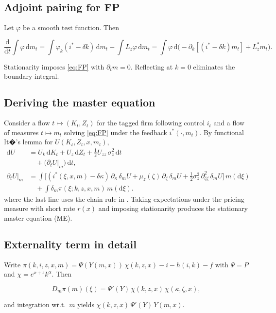 ﻿\documentclass[11pt,letterpaper,oneside]{article}
\numberwithin{equation}{section}
\newcommand{\1}{\mathbf{1}}
\newcommand{\diff}{\mathrm{d}}
\newcommand{\Lz}{L_z}
\newcommand{\Lzadj}{L_z^{\!*}}
\newcommand{\dmU}{\delta_m U}
\newcommand{\Dm}{D_m}
\begin{document}
\subsection{Adjoint pairing for FP}
Let $\varphi$ be a smooth test function. Then

$$
\frac{\diff}{\diff t}\int \varphi\,\diff m_t
= \int \varphi_k (i^*-\delta k)\,\diff m_t + \int \Lz \varphi\,\diff m_t
= \int \varphi\,\diff\Big(-\partial_k[(i^*-\delta k)m_t]+\Lzadj m_t\Big).
$$

Stationarity imposes \eqref{eq:FP} with $\partial_t m=0$. Reflecting at $k=0$ eliminates the boundary integral.

\subsection{Deriving the master equation}
Consider a flow $t\mapsto (K_t,Z_t)$ for the tagged firm following control $i_t$ and a flow of measures $t\mapsto m_t$ solving \eqref{eq:FP} under the feedback $i^*(\cdot,m_t)$. By functional It�'s lemma for $U(K_t,Z_t,x,m_t)$,
\begin{align*}
\diff U &= U_k\,\diff K_t + U_z\,\diff Z_t + \tfrac12 U_{zz}\,\sigma_z^2\,\diff t \\
        &\quad + \big(\partial_t U\big|_{m}\big)\,\diff t, \\
\partial_t U\big|_{m} &= \int \Big[ (i^*(\xi,x,m)-\delta\kappa)\,\partial_{\kappa}\,\dmU
  +\mu_z(\zeta)\,\partial_{\zeta}\,\dmU
  +\tfrac12\sigma_z^2\,\partial_{\zeta\zeta}^2\,\dmU\Big] \, m(\diff \xi) \\
  &\quad + \int \delta_m \pi(\xi; k,z,x,m) \, m(\diff \xi).
\end{align*}
  where the last line uses the chain rule in . Taking expectations under the pricing measure with short rate $r(x)$ and imposing stationarity produces the stationary master equation (ME).

\subsection{Externality term in detail}
Write $\pi(k,i,z,x,m)=\Psi(Y(m,x))\,\chi(k,z,x)-i-h(i,k)-f$ with $\Psi=P$ and $\chi=e^{x+z}k^\alpha$. Then

$$
\Dm\pi(m)(\xi)=\Psi'(Y)\,\chi(k,z,x)\,\chi(\kappa,\zeta,x),
$$

and integration w\.r.t.\ $m$ yields $\chi(k,z,x)\,\Psi'(Y)\,Y(m,x)$.

\end{document}
